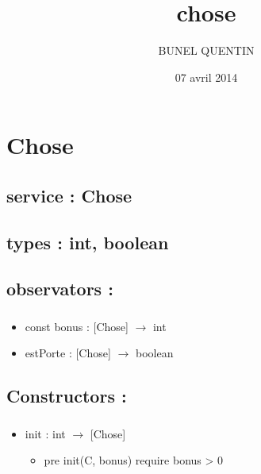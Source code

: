 \documentclass[11pt]{article}
\title{chose}
\author{BUNEL QUENTIN}
\date{07 avril 2014}
\begin{document}
\maketitle

\setcounter{tocdepth}{3}
\tableofcontents
\vspace*{1cm}
\section{Chose}
\label{sec-1}

\subsection{service : Chose}
\label{sec-1.1}

\subsection{types : int, boolean}
\label{sec-1.2}



\subsection{observators :}
\label{sec-1.3}

\subsubsection{}

\begin{itemize}

\item const bonus : [Chose] $\to$ int\\
\label{sec-1.3.1.1}


\item estPorte : [Chose] $\to$ boolean\\
\label{sec-1.3.1.2}


\end{itemize} %
\subsection{Constructors :}
\label{sec-1.4}

\subsubsection{}

\begin{itemize}

\item init : int $\to$ [Chose]\\
\label{sec-1.4.1.1}

\begin{itemize}

\item pre init(C, bonus) require bonus > 0\\
\label{sec-1.4.1.1.1}


\end{itemize} %
\end{itemize} %
\end{document}
